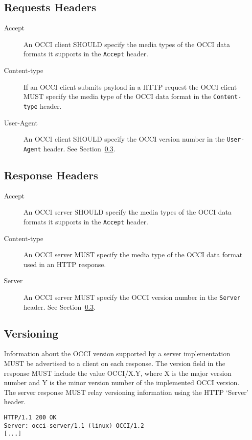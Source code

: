 \documentclass[10pt,a4paper]{article}
\begin{document}
\subsection{Requests Headers}

\begin{description}
\item[Accept] An OCCI client SHOULD specify the media types of the OCCI data
formats it supports in the {\tt Accept} header.
\item[Content-type] If an OCCI client submits payload in a HTTP request
the OCCI client MUST specify the media type of the OCCI data format
in the {\tt Content-type} header.
\item[User-Agent] An OCCI client SHOULD specify the OCCI version
number in the {\tt User-Agent} header. See Section~\ref{subsec:versioning}.
\end{description}

\subsection{Response Headers}

\begin{description}
\item[Accept] An OCCI server SHOULD specify the media types of the OCCI data
formats it supports in the {\tt Accept} header.
\item[Content-type] An OCCI server MUST specify the media type of the OCCI data
format used in an HTTP response.
\item[Server] An OCCI server MUST specify the OCCI version number in the {\tt Server}
header. See Section~\ref{subsec:versioning}.
\end{description}

\subsection{Versioning}
\label{subsec:versioning}
Information about the OCCI version supported by a server implementation
MUST be advertised to a client on each response.
The version field in the response MUST include the value
OCCI/X.Y, where X is the major version number and Y is the minor
version number of the implemented OCCI version. The server
response MUST relay versioning information using the HTTP `Server'
header.

\begin{verbatim}
HTTP/1.1 200 OK
Server: occi-server/1.1 (linux) OCCI/1.2
[...]
\end{verbatim}
\end{document}
